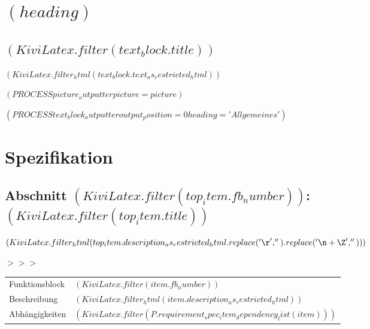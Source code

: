\documentclass{scrartcl}
\begin{document}

  \newpage

  \section{$( heading )$}


    \subsection{$( KiviLatex.filter(text_block.title) )$}

$( KiviLatex.filter_html(text_block.text_as_restricted_html) )$

$( PROCESS picture_outputter picture=picture )$


$( PROCESS text_block_outputter output_position=0 heading='Allgemeines' )$

\newpage

\section{Spezifikation}

\setlength{\LTpre}{-0.3cm}



  \subsection{Abschnitt $( KiviLatex.filter(top_item.fb_number) )$: $( KiviLatex.filter(top_item.title) )$}

    $( KiviLatex.filter_html(top_item.description_as_restricted_html.replace('\r', '').replace('\n+\Z', '')) )$

    \vspace{0.5cm}
\parbox[t]{1.0cm}{\textcolor{kivitendodarkred}{$>>>$}}%
\parbox[t]{15.0cm}{%
\begin{longtable}{p{2.8cm}p{11.7cm}}
  Funktionsblock & $( KiviLatex.filter(item.fb_number) )$\\
  Beschreibung & $( KiviLatex.filter_html(item.description_as_restricted_html) )$\\
  Abhängigkeiten & $( KiviLatex.filter(P.requirement_spec_item_dependency_list(item)) )$
\end{longtable}}
\end{document}
